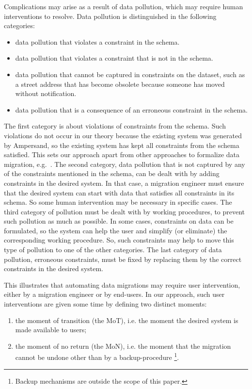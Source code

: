 \documentclass{elsarticle}
\begin{document}
   Complications may arise as a result of data pollution,
   which may require human interventions to resolve.
   Data pollution is distinguished in the following categories:
\begin{itemize}
   \item data pollution that violates a constraint in the schema.
   \item data pollution that violates a constraint that is not in the schema.
   \item data pollution that cannot be captured in constraints on the dataset,
   such as a street address that has become obsolete because someone has moved without notification.
   \item data pollution that is a consequence of an erroneous constraint in the schema.
\end{itemize}
   The first category is about violations of constraints from the schema.
   Such violations do not occur in our theory because the existing system was generated by Ampersand,
   so the existing system has kept all constraints from the schema satisfied.
   This sets our approach apart from other approaches to formalize data migration, e.g.~\cite{Thalheim2013}.
   The second category, data pollution that is not captured by any of the constraints mentioned in the schema,
   can be dealt with by adding constraints in the desired system.
   In that case, a migration engineer must ensure that the desired system can start with data that satisfies all constraints in its schema.
   So some human intervention may be necessary in specific cases.
   The third category of pollution must be dealt with by working procedures, to prevent such pollution as much as possible.
   In some cases, constraints on data can be formulated,
   so the system can help the user and simplify (or eliminate) the corresponding working procedure.
   So, such constraints may help to move this type of pollution to one of the other categories.
   The last category of data pollution, erroneous constraints, must be fixed by replacing them by the correct constraints in the desired system.

   This illustrates that automating data migrations may require user intervention,
   either by a migration engineer or by end-users.
   In our approach, such user interventions are given some time by
   defining two distinct moments:
\begin{enumerate}
   \item the moment of transition (the MoT), i.e. the moment the desired system is made available to users;
   \item the moment of no return (the MoN), i.e. the moment that the migration cannot be undone other than by a backup-procedure%
\footnote{Backup mechanisms are outside the scope of this paper.}.
\end{enumerate}
\end{document}
